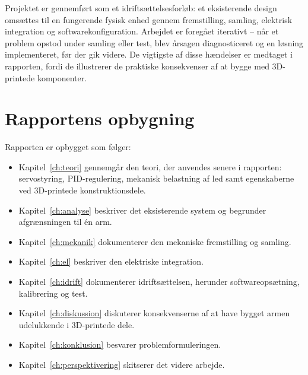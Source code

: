 Projektet er gennemført som et idriftsættelsesforløb: et eksisterende
design omsættes til en fungerende fysisk enhed gennem fremstilling, samling,
elektrisk integration og softwarekonfiguration. Arbejdet er foregået iterativt
-- når et problem opstod under samling eller test, blev årsagen diagnosticeret
og en løsning implementeret, før der gik videre. De vigtigste af disse
hændelser er medtaget i rapporten, fordi de illustrerer de praktiske
konsekvenser af at bygge med 3D-printede komponenter.

\section{Rapportens opbygning}

Rapporten er opbygget som følger:

\begin{itemize}
    \item Kapitel~\ref{ch:teori} gennemgår den teori, der anvendes senere
          i rapporten: servostyring, PID-regulering, mekanisk belastning af
          led samt egenskaberne ved 3D-printede konstruktionsdele.
    \item Kapitel~\ref{ch:analyse} beskriver det eksisterende system og
          begrunder afgrænsningen til én arm.
    \item Kapitel~\ref{ch:mekanik} dokumenterer den mekaniske fremstilling
          og samling.
    \item Kapitel~\ref{ch:el} beskriver den elektriske integration.
    \item Kapitel~\ref{ch:idrift} dokumenterer idriftsættelsen, herunder
          softwareopsætning, kalibrering og test.
    \item Kapitel~\ref{ch:diskussion} diskuterer konsekvenserne af at have
          bygget armen udelukkende i 3D-printede dele.
    \item Kapitel~\ref{ch:konklusion} besvarer problemformuleringen.
    \item Kapitel~\ref{ch:perspektivering} skitserer det videre arbejde.
\end{itemize}
